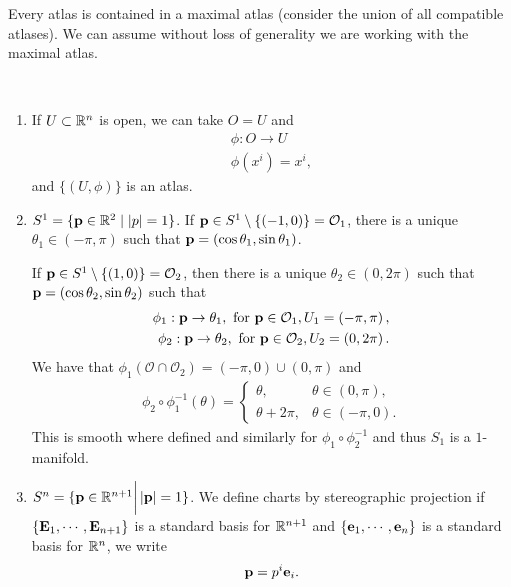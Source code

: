 Every atlas is contained in a maximal atlas (consider the union of all compatible atlases). We can assume without loss of generality we are working with the maximal atlas.

\begin{examples}~
    \begin{enumerate}[label=\roman*)]
        \item If $U \subset \mathbb{R}^{n}$ is open, we can take $O = U$ and
            \begin{align}
                \phi : O \to U \\
                \phi \left( x^{i} \right) = x^{i}
            ,\end{align}
            and $\{\left( U,\phi \right) \} $ is an atlas.
        \item $S^{1} = \{ \vb{p} \in \mathbb{R}^{2}  \mid  \left| p \right| = 1\} $.
            If $\vb{p} \in S^{1} \setminus \{ \left( -1,0 \right) \} = \mathcal{O}_1$, there is a unique $\theta_1 \in \left( -\pi, \pi \right) $ such that $\vb{p} = \left( \cos \theta_1, \sin \theta_1 \right) $.

            If $\vb{p} \in S^{1} \setminus \{\left( 1,0 \right) \} = \mathcal{O}_2$, then there is a unique $\theta_2 \in \left( 0, 2\pi \right) $ such that $\vb{p} = \left( \cos \theta_2, \sin \theta_2 \right) $ such that
            \begin{align}
                \phi_1 : \vb{p} \to \theta_1, \text{~for~} \vb{p} \in \mathcal{O}_1, U_1 = \left( -\pi, \pi \right), \\
                \phi_2 : \vb{p} \to \theta_2, \text{~for~} \vb{p} \in \mathcal{O}_2, U_2 = \left( 0,2\pi \right)
            .\end{align}
            We have that $\phi_1 \left( \mathcal{O} \cap \mathcal{O}_2 \right) = \left( -\pi,0 \right) \cup \left( 0,\pi \right) $ and 
            \begin{align}
                \phi_2 \circ \phi_1^{-1} \left( \theta \right) = \begin{cases}
                    \theta, & \theta \in \left( 0, \pi \right),\\
                    \theta + 2\pi , & \theta \in \left( -\pi,0 \right) .
                \end{cases}
            \end{align}
            This is smooth where defined and similarly for $\phi_1 \circ \phi_2^{-1}$ and thus $S_1$ is a $1$-manifold.
        \item $S^{n} = \{\vb{p} \in \mathbb{R}^{n+1}  \bigg|  \left| \vb{p} \right| = 1\} $.
            We define charts by stereographic projection if $\{\vb{E}_1, \cdots , \vb{E}_{n+1}\} $ is a standard basis for $\mathbb{R}^{n+1}$ and $\{\vb{e}_1, \cdots, \vb{e}_{n}\} $ is a standard basis for $\mathbb{R}^{n}$, we write
            \begin{align}
                \vb{p} = p^{i}\vb{e}_{i}
            .\end{align}


\end{enumerate}
\end{examples}
